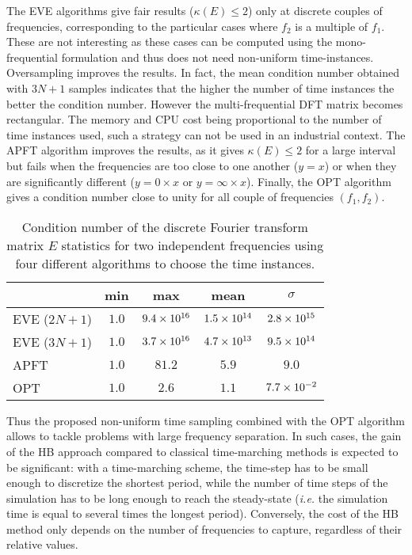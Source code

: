 The EVE algorithms give fair results ($\kappa(E) \leq 2$) only at
discrete couples of frequencies, corresponding to the particular cases where $f_2$ is a
multiple of $f_1$. These are not interesting as these
cases can be computed using the mono-frequential formulation and thus does not
need non-uniform time-instances. Oversampling improves the results. 
In fact, the mean condition number obtained
with $3N + 1$ samples indicates that the higher the number of time instances
the better the condition number. However the multi-frequential DFT
matrix becomes rectangular. The memory and CPU cost being proportional to 
the number of time instances used, such a strategy can not be
used in an industrial context. The APFT
algorithm improves the results, as it gives $\kappa (E) \leq 2$ 
for a large interval but fails when the frequencies
are too close to one another ($y=x$) or when they are significantly
different ($y=0 \times x$ or $y = \infty \times x$).  
Finally, the OPT algorithm gives a condition number close to unity for
all couple of frequencies $(f_1, f_2)$. 
\begin{table}[htb]
  \centering
  \begin{tabular}{lcccc}
    \toprule
    \phantom{abdefghijk} & min & max & mean & $\sigma$ \\
    \midrule
    EVE ($2N + 1$) & $1.0$ & $9.4\times 10^{16}$ & $1.5\times 10^{14}$ & $2.8\times 10^{15}$ \\
    EVE ($3N + 1$) & $1.0$ & $3.7\times 10^{16}$ & $4.7\times 10^{13}$ & $9.5\times 10^{14}$ \\
    APFT & $1.0$ & $81.2$ & $5.9$ & $9.0$ \\
    OPT & $1.0$ & $2.6$ & $1.1$ & $7.7\times 10^{-2}$ \\
    \bottomrule
  \end{tabular}
  \caption{Condition number of the discrete Fourier transform matrix $E$
  statistics for two independent frequencies using four different algorithms
  to choose the time instances.}
  \label{tab:algo_sum}
\end{table} 

Thus the proposed non-uniform time sampling combined with the OPT
algorithm allows to tackle problems with large frequency
separation. In such cases, the gain of the HB approach compared
to classical time-marching methods is expected to be significant: with
a time-marching scheme, the time-step has to be small enough to
discretize the shortest period, while the number of time steps of the
simulation has to be long enough to reach the steady-state
(\emph{i.e.}  the simulation time is equal to several
times the longest period). Conversely, the cost of the HB method only
depends on the number of frequencies to capture, regardless of their
relative values.

